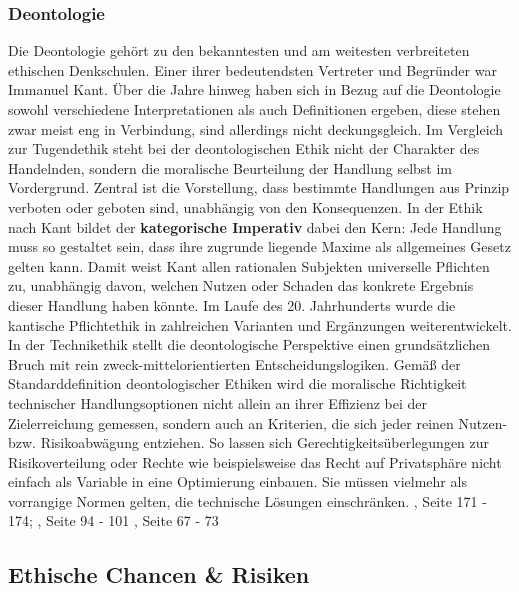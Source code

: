 \subsubsection{Deontologie}
Die Deontologie gehört zu den bekanntesten und am weitesten verbreiteten ethischen Denkschulen. Einer ihrer bedeutendsten Vertreter und Begründer war Immanuel Kant. Über die Jahre hinweg haben sich in Bezug auf die Deontologie sowohl verschiedene Interpretationen als auch Definitionen ergeben, diese stehen zwar meist eng in Verbindung, sind allerdings nicht deckungsgleich. Im Vergleich zur Tugendethik steht bei der deontologischen Ethik nicht der Charakter des Handelnden, sondern die moralische Beurteilung der Handlung selbst im Vordergrund. Zentral ist die Vorstellung, dass bestimmte Handlungen aus Prinzip verboten oder geboten sind, unabhängig von den Konsequenzen. In der Ethik nach Kant bildet der \textbf{kategorische Imperativ} dabei den Kern: Jede Handlung muss so gestaltet sein, dass ihre zugrunde liegende Maxime als allgemeines Gesetz gelten kann. Damit weist Kant allen rationalen Subjekten universelle Pflichten zu, unabhängig davon, welchen Nutzen oder Schaden das konkrete Ergebnis dieser Handlung haben könnte. Im Laufe des 20. Jahrhunderts wurde die kantische Pflichtethik in zahlreichen Varianten und Ergänzungen weiterentwickelt. In der Technikethik stellt die deontologische Perspektive einen grundsätzlichen Bruch mit rein zweck-mittelorientierten Entscheidungslogiken. Gemäß der Standarddefinition deontologischer Ethiken wird die moralische Richtigkeit technischer Handlungsoptionen nicht allein an ihrer Effizienz bei der Zielerreichung gemessen, sondern auch an Kriterien, die sich jeder reinen Nutzen- bzw. Risikoabwägung entziehen. So lassen sich Gerechtigkeitsüberlegungen zur Risikoverteilung oder Rechte wie beispielsweise das Recht auf Privatsphäre nicht einfach als Variable in eine Optimierung einbauen. Sie müssen vielmehr als vorrangige Normen gelten, die technische Lösungen einschränken. \cite{grunwaldHandbuchTechnikethik2021}, Seite 171 - 174; \cite{plegerGuteLebenEinfuehrung2017}, Seite 94 - 101 \cite{neuhaeuserHandbuchAngewandteEthik2023}, Seite 67 - 73

\subsection{Ethische Chancen \& Risiken}

